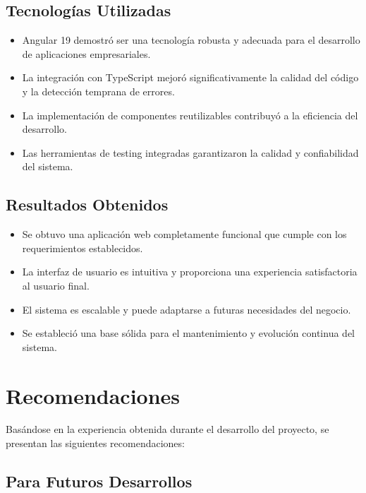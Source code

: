 \subsection{Tecnologías Utilizadas}

\begin{itemize}
    \item Angular 19 demostró ser una tecnología robusta y adecuada para el desarrollo de aplicaciones empresariales.
    \item La integración con TypeScript mejoró significativamente la calidad del código y la detección temprana de errores.
    \item La implementación de componentes reutilizables contribuyó a la eficiencia del desarrollo.
    \item Las herramientas de testing integradas garantizaron la calidad y confiabilidad del sistema.
\end{itemize}

\subsection{Resultados Obtenidos}

\begin{itemize}
    \item Se obtuvo una aplicación web completamente funcional que cumple con los requerimientos establecidos.
    \item La interfaz de usuario es intuitiva y proporciona una experiencia satisfactoria al usuario final.
    \item El sistema es escalable y puede adaptarse a futuras necesidades del negocio.
    \item Se estableció una base sólida para el mantenimiento y evolución continua del sistema.
\end{itemize}

\section{Recomendaciones}

Basándose en la experiencia obtenida durante el desarrollo del proyecto, se presentan las siguientes recomendaciones:

\subsection{Para Futuros Desarrollos}

